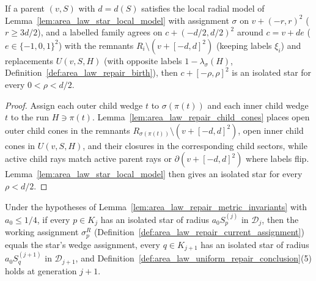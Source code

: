 \begin{lemma}
    \label{thm:area_law_repair_child_stars}
    \leanok
    If a parent $(v,S)$ with $d=d(S)$ satisfies the local radial model of
    Lemma~\ref{lem:area_law_star_local_model} with assignment $\sigma$ on $v+(-r,r)^2$ ($r\ge3d/2$),
    and a labelled family agrees on $c+(-d/2,d/2)^2$ around $c=v+de$ ($e\in\{-1,0,1\}^2$) with the
    remnants $R_i\setminus(v+[-d,d]^2)$ (keeping labels $\xi_i$) and replacements $U(v,S,H)$
    (with opposite labels $1-\lambda_\sigma(H)$, Definition~\ref{def:area_law_repair_birth}),
    then $c+[-\rho,\rho]^2$ is an isolated star for every $0<\rho<d/2$.
\end{lemma}

\begin{proof}
    \leanok
    Assign each outer child wedge $t$ to $\sigma(\pi(t))$ and each inner child wedge $t$ to the
    run $H\ni\pi(t)$. Lemma~\ref{lem:area_law_repair_child_cones} places open outer child cones in
    the remnants $R_{\sigma(\pi(t))}\setminus(v+[-d,d]^2)$, open inner child cones in $U(v,S,H)$,
    and their closures in the corresponding child sectors, while active child rays match active
    parent rays or $\partial(v+[-d,d]^2)$ where labels flip. Lemma~\ref{lem:area_law_star_local_model}
    then gives an isolated star for every $\rho<d/2$.
\end{proof}

\begin{lemma}
    \label{thm:area_law_repair_generation_step}
    \leanok
    Under the hypotheses of Lemma~\ref{lem:area_law_repair_metric_invariants} with $a_0\le1/4$,
    if every $p\in K_j$ has an isolated star of radius $a_0S_p^{(j)}$ in $\mathcal D_j$, then
    the working assignment $\sigma_p^R$ (Definition~\ref{def:area_law_repair_current_assignment})
    equals the star's wedge assignment, every $q\in K_{j+1}$ has an isolated star of radius
    $a_0S_q^{(j+1)}$ in $\mathcal D_{j+1}$, and Definition~\ref{def:area_law_uniform_repair_conclusion}(5)
    holds at generation $j+1$.
\end{lemma}

